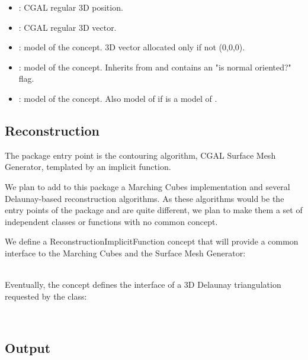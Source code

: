 \begin{itemize}
\item {}: CGAL regular 3D position.
\item {}: CGAL regular 3D vector.
\item {}: model of the  concept. 3D vector allocated only if not (0,0,0).
\item {}: model of the  concept.
Inherits from  and contains an "is normal oriented?" flag.
\item {}: model of the  concept.
Also model of  if  is a model of .
\end{itemize}


\subsection{Reconstruction}

The package entry point is the contouring algorithm, CGAL Surface Mesh Generator,
templated by an implicit function.

We plan to add to this package a Marching Cubes implementation and
several Delaunay-based reconstruction algorithms.
As these algorithms would be the entry points of the package and are quite
different, we plan to make them a set of independent classes or functions
with no common concept.

We define a ReconstructionImplicitFunction concept that will provide
a common interface to the Marching Cubes and the Surface Mesh Generator:

  \\

Eventually, the  concept defines the interface of a 3D Delaunay triangulation requested by the  class:

  \\


\subsection{Output}

